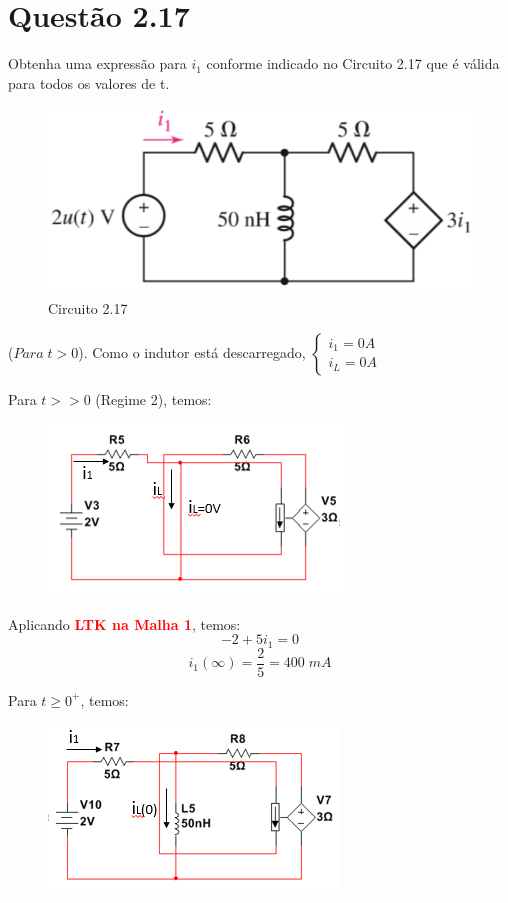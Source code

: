 \documentclass[
	12pt,				%
	oneside,			%
	a4paper,			%
	english,			%
	french,				%
	spanish,			%
	brazil				%
	]{abntex2}
\begin{document}
\section*{Questão 2.17}
Obtenha uma expressão para $i_1$ conforme indicado no Circuito 2.17 que é válida para todos os valores de t.
\begin{figure}[htb]
	\centering
	\includegraphics[scale=0.5]{2-17.PNG}
	\caption{Circuito 2.17}
\end{figure}

($Para \; t>0$). Como o indutor está descarregado,
$\begin{cases}
i_1 = 0A \\
i_L = 0A
\end{cases}$

Para $t>>0$ (Regime 2), temos:
\begin{figure}[htb]
	\centering
	\includegraphics[scale=1]{Circuito_2-17(b).PNG}
\end{figure}

Aplicando \textbf{\textcolor{red}{LTK na Malha 1}}, temos:
$$-2+5i_1=0$$
$$i_1(\infty)=\dfrac{2}{5}=400\;mA$$

Para ${t\geq{0^+}}$, temos:

\begin{figure}[htb]
	\centering
	\includegraphics[scale=1]{Circuito_2-17(c).PNG}
\end{figure}
\end{document}

